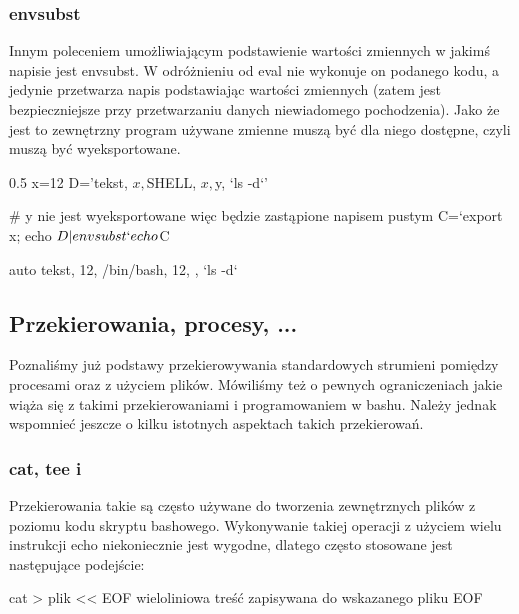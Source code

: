 \subsubsection{envsubst}

Innym poleceniem umożliwiającym podstawienie wartości zmiennych w jakimś napisie jest envsubst.
W odróżnieniu od eval nie wykonuje on podanego kodu, a jedynie przetwarza napis
podstawiając wartości zmiennych (zatem jest bezpieczniejsze przy przetwarzaniu danych
niewiadomego pochodzenia). Jako że jest to zewnętrzny program używane zmienne
muszą być dla niego dostępne, czyli muszą być wyeksportowane.

\begin{CodeFrame}[bash]{0.5\textwidth}
x=12
D='tekst, ${x}, $SHELL, $x, $y, `ls -d`'

# y nie jest wyeksportowane więc będzie zastąpione napisem pustym
C=`export x; echo $D | envsubst`
echo $C
\end{CodeFrame}
\begin{CodeFrame}{auto}
tekst, 12, /bin/bash, 12, , `ls -d`
\end{CodeFrame}


\subsection{Przekierowania, procesy, ...}

Poznaliśmy już podstawy przekierowywania standardowych strumieni pomiędzy procesami oraz z użyciem plików.
Mówiliśmy też o pewnych ograniczeniach jakie wiąża się z takimi przekierowaniami i programowaniem w bashu.
Należy jednak wspomnieć jeszcze o kilku istotnych aspektach takich przekierowań.

\subsubsection{cat, tee i \shell{<<}}

Przekierowania takie są często używane do tworzenia zewnętrznych plików z poziomu kodu skryptu bashowego.
Wykonywanie takiej operacji z użyciem wielu instrukcji echo niekoniecznie jest wygodne, dlatego często stosowane jest następujące podejście:

\begin{CodeFrame*}[bash]{}
cat > plik << EOF
wieloliniowa
treść zapisywana
do wskazanego pliku
EOF
\end{CodeFrame*}

